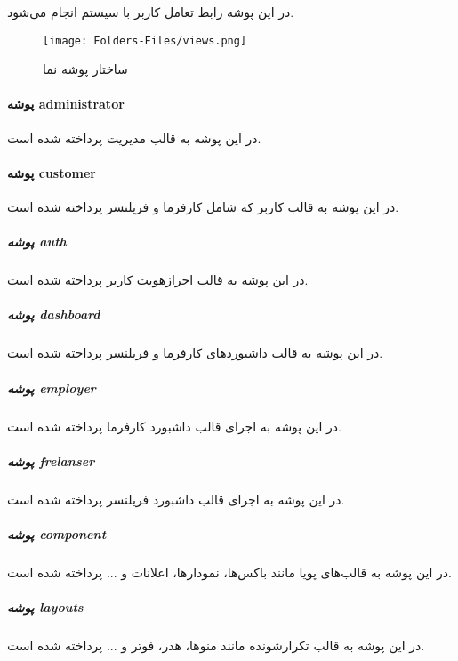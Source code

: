 در این پوشه رابط تعامل کاربر با سیستم انجام می‌شود.

\begin{figure}[H]
	\texttt{[image: Folders-Files/views.png]}
	\centering
	\caption{ساختار پوشه نما}
	\label{fig:folder-views}
\end{figure}


\paragraph{پوشه administrator}
در این پوشه به قالب مدیریت پرداخته شده است.

\paragraph{پوشه customer}
در این پوشه به قالب کاربر که شامل کارفرما و فریلنسر پرداخته شده است.

\subparagraph{پوشه auth}
در این پوشه به قالب احرازهویت کاربر پرداخته شده است.

\subparagraph{پوشه dashboard}
در این پوشه به قالب داشبوردهای کارفرما و فریلنسر پرداخته شده است.

\subparagraph{پوشه employer}
در این پوشه به اجرای قالب داشبورد کارفرما پرداخته شده است.

\subparagraph{پوشه frelanser}
در این پوشه به اجرای قالب داشبورد فریلنسر پرداخته شده است.

\subparagraph{پوشه component}
در این پوشه به قالب‌های پویا مانند باکس‌ها، نمودارها، اعلانات و ... پرداخته شده است.
\subparagraph{پوشه layouts}
در این پوشه به قالب تکرارشونده مانند منوها، هدر، فوتر و ... پرداخته شده است.
